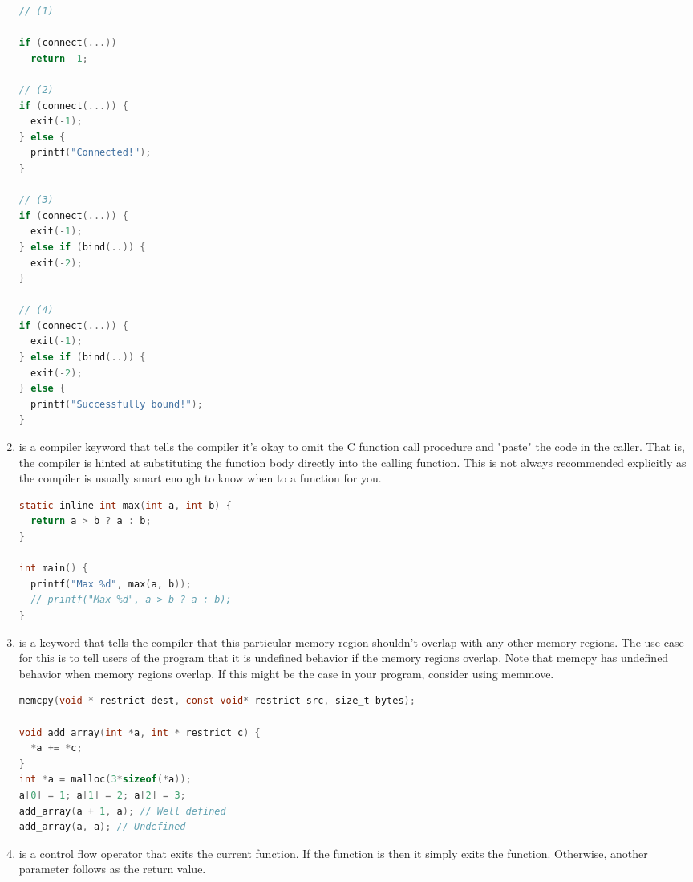 \begin{enumerate}
	      \begin{lstlisting}[language=C]
// (1)

if (connect(...))
  return -1;

// (2)
if (connect(...)) {
  exit(-1);
} else {
  printf("Connected!");
}

// (3)
if (connect(...)) {
  exit(-1);
} else if (bind(..)) {
  exit(-2);
}

// (4)
if (connect(...)) {
  exit(-1);
} else if (bind(..)) {
  exit(-2);
} else {
  printf("Successfully bound!");
}
\end{lstlisting}

	    \item {} is a compiler keyword that tells the compiler it's okay to omit the C function call procedure and "paste" the code in the caller.
        That is, the compiler is hinted at substituting the function body directly into the calling function.
        This is not always recommended explicitly as the compiler is usually smart enough to know when to  a function for you.

	      \begin{lstlisting}[language=C]
static inline int max(int a, int b) {
  return a > b ? a : b;
}

int main() {
  printf("Max %d", max(a, b));
  // printf("Max %d", a > b ? a : b);
}
\end{lstlisting}

	    \item {} is a keyword that tells the compiler that this particular memory region shouldn't overlap with any other memory regions.
        The use case for this is to tell users of the program that it is undefined behavior if the memory regions overlap.
        Note that memcpy has undefined behavior when memory regions overlap.
        If this might be the case in your program, consider using memmove.

	      \begin{lstlisting}[language=C]
memcpy(void * restrict dest, const void* restrict src, size_t bytes);

void add_array(int *a, int * restrict c) {
  *a += *c;
}
int *a = malloc(3*sizeof(*a));
a[0] = 1; a[1] = 2; a[2] = 3;
add_array(a + 1, a); // Well defined
add_array(a, a); // Undefined
\end{lstlisting}

	    \item {} is a control flow operator that exits the current function.
        If the function is  then it simply exits the function.
        Otherwise, another parameter follows as the return value.


\end{enumerate}
